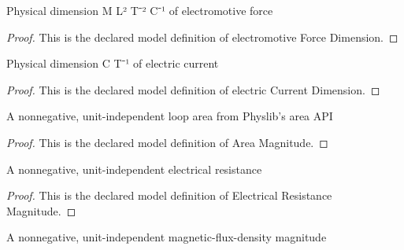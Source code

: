 \begin{definition}
  \label{def:physics:phyx-mini-0935:phyxminiproblems-problemphyxmini0935-electromotiveforcedimension}
  Physical dimension M L² T⁻² C⁻¹ of electromotive force
\end{definition}
\begin{proof}
  This is the declared model definition of electromotive Force Dimension.
\end{proof}
\begin{definition}
  \label{def:physics:phyx-mini-0935:phyxminiproblems-problemphyxmini0935-electriccurrentdimension}
  Physical dimension C T⁻¹ of electric current
\end{definition}
\begin{proof}
  This is the declared model definition of electric Current Dimension.
\end{proof}
\begin{definition}
  \label{def:physics:phyx-mini-0935:phyxminiproblems-problemphyxmini0935-areamagnitude}
  A nonnegative, unit-independent loop area from Physlib's area API
\end{definition}
\begin{proof}
  This is the declared model definition of Area Magnitude.
\end{proof}
\begin{definition}
  \label{def:physics:phyx-mini-0935:phyxminiproblems-problemphyxmini0935-electricalresistancemagnitude}
  A nonnegative, unit-independent electrical resistance
\end{definition}
\begin{proof}
  This is the declared model definition of Electrical Resistance Magnitude.
\end{proof}
\begin{definition}
  \label{def:physics:phyx-mini-0935:phyxminiproblems-problemphyxmini0935-magneticfluxdensitymagnitude}
  A nonnegative, unit-independent magnetic-flux-density magnitude
\end{definition}
